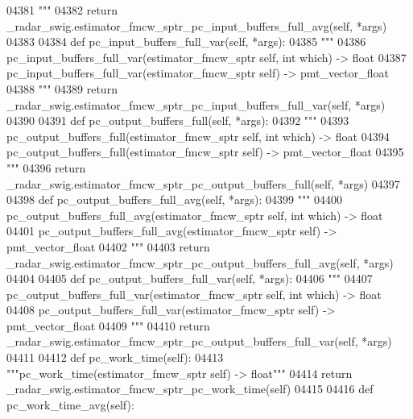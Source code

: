 \begin{DoxyCode}
{{{{{{{{{{{{{{{04381 \textcolor{stringliteral}{        """}
04382         \textcolor{keywordflow}{return} \_radar\_swig.estimator\_fmcw\_sptr\_pc\_input\_buffers\_full\_avg(self, *args)
04383 
04384     \textcolor{keyword}{def }pc_input_buffers_full_var(self, *args):
04385         \textcolor{stringliteral}{"""}
04386 \textcolor{stringliteral}{        pc\_input\_buffers\_full\_var(estimator\_fmcw\_sptr self, int which) -> float}
04387 \textcolor{stringliteral}{        pc\_input\_buffers\_full\_var(estimator\_fmcw\_sptr self) -> pmt\_vector\_float}
04388 \textcolor{stringliteral}{        """}
04389         \textcolor{keywordflow}{return} \_radar\_swig.estimator\_fmcw\_sptr\_pc\_input\_buffers\_full\_var(self, *args)
04390 
04391     \textcolor{keyword}{def }pc_output_buffers_full(self, *args):
04392         \textcolor{stringliteral}{"""}
04393 \textcolor{stringliteral}{        pc\_output\_buffers\_full(estimator\_fmcw\_sptr self, int which) -> float}
04394 \textcolor{stringliteral}{        pc\_output\_buffers\_full(estimator\_fmcw\_sptr self) -> pmt\_vector\_float}
04395 \textcolor{stringliteral}{        """}
04396         \textcolor{keywordflow}{return} \_radar\_swig.estimator\_fmcw\_sptr\_pc\_output\_buffers\_full(self, *args)
04397 
04398     \textcolor{keyword}{def }pc_output_buffers_full_avg(self, *args):
04399         \textcolor{stringliteral}{"""}
04400 \textcolor{stringliteral}{        pc\_output\_buffers\_full\_avg(estimator\_fmcw\_sptr self, int which) -> float}
04401 \textcolor{stringliteral}{        pc\_output\_buffers\_full\_avg(estimator\_fmcw\_sptr self) -> pmt\_vector\_float}
04402 \textcolor{stringliteral}{        """}
04403         \textcolor{keywordflow}{return} \_radar\_swig.estimator\_fmcw\_sptr\_pc\_output\_buffers\_full\_avg(self, *args)
04404 
04405     \textcolor{keyword}{def }pc_output_buffers_full_var(self, *args):
04406         \textcolor{stringliteral}{"""}
04407 \textcolor{stringliteral}{        pc\_output\_buffers\_full\_var(estimator\_fmcw\_sptr self, int which) -> float}
04408 \textcolor{stringliteral}{        pc\_output\_buffers\_full\_var(estimator\_fmcw\_sptr self) -> pmt\_vector\_float}
04409 \textcolor{stringliteral}{        """}
04410         \textcolor{keywordflow}{return} \_radar\_swig.estimator\_fmcw\_sptr\_pc\_output\_buffers\_full\_var(self, *args)
04411 
04412     \textcolor{keyword}{def }pc_work_time(self):
04413         \textcolor{stringliteral}{"""pc\_work\_time(estimator\_fmcw\_sptr self) -> float"""}
04414         \textcolor{keywordflow}{return} \_radar\_swig.estimator\_fmcw\_sptr\_pc\_work\_time(self)
04415 
04416     \textcolor{keyword}{def }pc_work_time_avg(self):
}}}}}}}}}}}}}}}
\end{DoxyCode}
